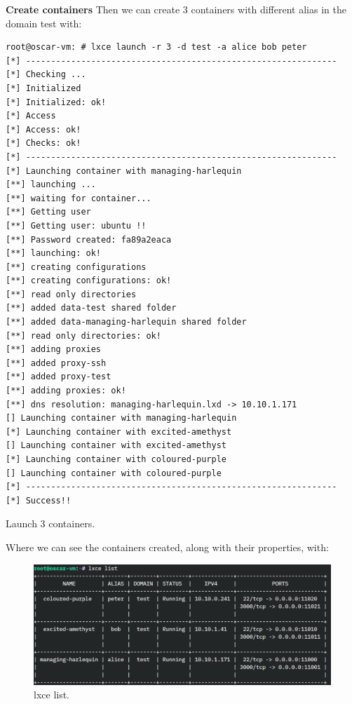 \newpage
\textbf{Create containers}
Then we can create 3 containers with different alias in the domain test with:
\begin{listing}[H]
\begin{verbatim}
root@oscar-vm: # lxce launch -r 3 -d test -a alice bob peter 
[*] --------------------------------------------------------------
[*] Checking ...
[*] Initialized
[*] Initialized: ok!
[*] Access
[*] Access: ok!
[*] Checks: ok!
[*] --------------------------------------------------------------
[*] Launching container with managing-harlequin
[**] launching ...
[**] waiting for container...
[**] Getting user
[**] Getting user: ubuntu !!
[**] Password created: fa89a2eaca
[**] launching: ok!
[**] creating configurations
[**] creating configurations: ok!
[**] read only directories
[**] added data-test shared folder
[**] added data-managing-harlequin shared folder
[**] read only directories: ok!
[**] adding proxies
[**] added proxy-ssh
[**] added proxy-test
[**] adding proxies: ok!
[**] dns resolution: managing-harlequin.lxd -> 10.10.1.171
[] Launching container with managing-harlequin
[*] Launching container with excited-amethyst
[] Launching container with excited-amethyst
[*] Launching container with coloured-purple
[] Launching container with coloured-purple
[*] --------------------------------------------------------------
[*] Success!!
\end{verbatim}
\caption[lxce launch]{\footnotesize{Launch 3 containers.}}
\end{listing}

\newpage
Where we can see the containers created, along with their properties, with:

\begin{figure}[H]
\label{fig:lxce list}
\centering
\includegraphics[width=\textwidth]{img/04/lxce-list.pdf}
\caption[lxce list]{\footnotesize{lxce list.}}
\end{figure}


